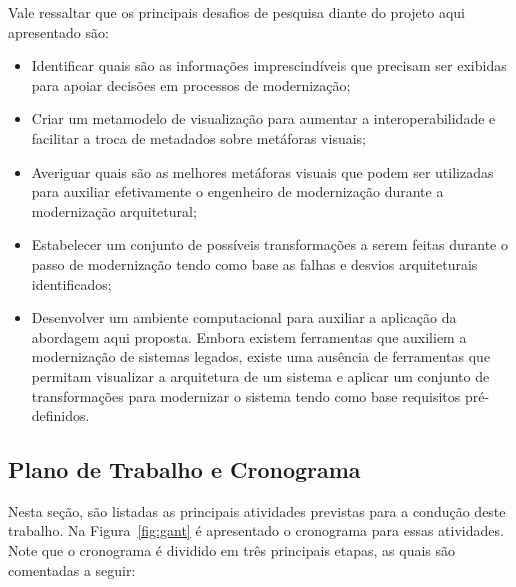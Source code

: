 \documentclass[12pt]{article}
\begin{document}
Vale ressaltar que os principais desafios de pesquisa diante do projeto aqui apresentado são:

\begin{itemize}
\item Identificar quais são as informações imprescindíveis que precisam ser exibidas para apoiar decisões em processos de modernização;
\item Criar um metamodelo de visualização para aumentar a interoperabilidade e facilitar a troca de metadados sobre metáforas visuais;
\item Averiguar quais são as melhores metáforas visuais que podem ser utilizadas para auxiliar efetivamente o engenheiro de modernização durante a modernização arquitetural; 
\item Estabelecer um conjunto de possíveis transformações a serem feitas durante o passo de modernização tendo como base as falhas e desvios arquiteturais identificados;
\item Desenvolver um ambiente computacional para auxiliar a aplicação da abordagem aqui proposta. Embora existem ferramentas que auxiliem a modernização de sistemas legados, existe uma ausência de ferramentas que permitam visualizar a arquitetura de um sistema e aplicar um conjunto de transformações para modernizar o sistema tendo como base requisitos pré-definidos.

\end{itemize}

\subsection{Plano de Trabalho e Cronograma}

Nesta seção, são listadas as principais atividades previstas para a condução deste trabalho. Na Figura~\ref{fig:gant} é apresentado o cronograma para essas atividades. Note que o cronograma é dividido em três principais etapas, as quais são comentadas a seguir:
\end{document}
